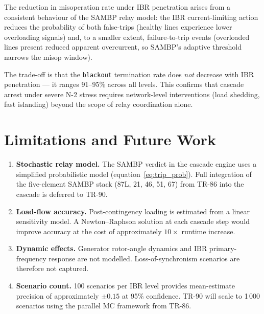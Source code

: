 \documentclass[11pt,a4paper]{article}
\begin{document}
\vspace{6pt}

The reduction in misoperation rate under IBR penetration arises from a
consistent behaviour of the SAMBP relay model: the IBR current-limiting
action reduces the probability of both false-trips (healthy lines
experience lower overloading signals) and, to a smaller extent,
failure-to-trip events (overloaded lines present reduced apparent
overcurrent, so SAMBP's adaptive threshold narrows the misop window).

The trade-off is that the \texttt{blackout} termination rate does
\emph{not} decrease with IBR penetration — it ranges 91–95\% across
all levels.  This confirms that cascade arrest under severe N-2 stress
requires network-level interventions (load shedding, fast islanding)
beyond the scope of relay coordination alone.

\section{Limitations and Future Work}

\begin{enumerate}
  \item \textbf{Stochastic relay model.}
    The SAMBP verdict in the cascade engine uses a simplified probabilistic
    model (equation~\eqref{eq:trip_prob}).  Full integration of the
    five-element SAMBP stack (87L, 21, 46, 51, 67) from TR-86 into
    the cascade is deferred to TR-90.

  \item \textbf{Load-flow accuracy.}
    Post-contingency loading is estimated from a linear sensitivity model.
    A Newton–Raphson solution at each cascade step would improve accuracy
    at the cost of approximately $10\times$ runtime increase.

  \item \textbf{Dynamic effects.}
    Generator rotor-angle dynamics and IBR primary-frequency response are
    not modelled.  Loss-of-synchronism scenarios are therefore not captured.

  \item \textbf{Scenario count.}
    100 scenarios per IBR level provides mean-estimate precision of
    approximately $\pm 0.15$ at 95\% confidence.  TR-90 will scale to
    1\,000 scenarios using the parallel MC framework from TR-86.
\end{enumerate}
\end{document}

